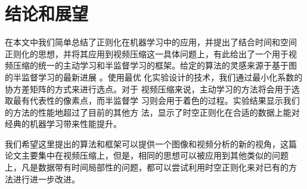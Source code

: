 \chapter{结论和展望}

在本文中我们简单总结了正则化在机器学习中的应用，并提出了结合时间和空间
正则化的思想，并将其应用到视频压缩这一具体问题上，有此给出了一个用于视
频压缩的统一的主动学习和半监督学习的框架。给定的算法的灵感来源于基于图
的半监督学习的最新进展 \cite{Manifold-Regularization-Journal}。使用最优
化实验设计的技术，我们通过最小化系数的协方差矩阵的方式来进行选点。对于
视频压缩来说，主动学习的方法将会用于选取最有代表性的像素点，而半监督学
习则会用于着色的过程。实验结果显示我们的方法的性能地超过了目前的其他方
法，显示了时空正则化在合适的数据上能对经典的机器学习带来性能提升。

我们希望这里提出的算法和框架可以提供一个图像和视频分析的新的视角，这篇
论文主要集中在视频压缩上，但是，相同的思想可以被应用到其他类似的问题
上，凡是数据带有时间局部性的问题，都可以尝试利用时空正则化来对已有的方
法进行进一步改进。

